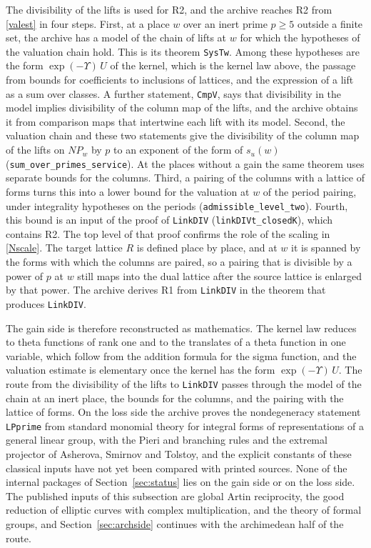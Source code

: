\documentclass[11pt,letterpaper]{article}
\numberwithin{equation}{section}
\begin{document}
The divisibility of the lifts is used for R2, and the archive reaches R2 from \eqref{valest} in four steps. First, at a place $w$ over an inert prime $p\ge5$ outside a finite set, the archive has a model of the chain of lifts at $w$ for which the hypotheses of the valuation chain hold. This is its theorem \texttt{SysTw}. Among these hypotheses are the form $\exp(-\Upsilon)\,U$ of the kernel, which is the kernel law above, the passage from bounds for coefficients to inclusions of lattices, and the expression of a lift as a sum over classes. A further statement, \texttt{CmpV}, says that divisibility in the model implies divisibility of the column map of the lifts, and the archive obtains it from comparison maps that intertwine each lift with its model. Second, the valuation chain and these two statements give the divisibility of the column map of the lifts on $N\!P_w$ by $p$ to an exponent of the form of $s_u(w)$ (\texttt{sum\_over\_primes\_service}). At the places without a gain the same theorem uses separate bounds for the columns. Third, a pairing of the columns with a lattice of forms turns this into a lower bound for the valuation at $w$ of the period pairing, under integrality hypotheses on the periods (\texttt{admissible\_level\_two}). Fourth, this bound is an input of the proof of \texttt{LinkDIV} (\texttt{linkDIVt\_closedK}), which contains R2. The top level of that proof confirms the role of the scaling in \eqref{Nscale}. The target lattice $R$ is defined place by place, and at $w$ it is spanned by the forms with which the columns are paired, so a pairing that is divisible by a power of $p$ at $w$ still maps into the dual lattice after the source lattice is enlarged by that power. The archive derives R1 from \texttt{LinkDIV} in the theorem that produces \texttt{LinkDIV}.

The gain side is therefore reconstructed as mathematics. The kernel law reduces to theta functions of rank one and to the translates of a theta function in one variable, which follow from the addition formula for the sigma function, and the valuation estimate is elementary once the kernel has the form $\exp(-\Upsilon)\,U$. The route from the divisibility of the lifts to \texttt{LinkDIV} passes through the model of the chain at an inert place, the bounds for the columns, and the pairing with the lattice of forms. On the loss side the archive proves the nondegeneracy statement \texttt{LPprime} from standard monomial theory for integral forms of representations of a general linear group, with the Pieri and branching rules and the extremal projector of Asherova, Smirnov and Tolstoy, and the explicit constants of these classical inputs have not yet been compared with printed sources. None of the internal packages of Section~\ref{sec:status} lies on the gain side or on the loss side. The published inputs of this subsection are global Artin reciprocity, the good reduction of elliptic curves with complex multiplication, and the theory of formal groups, and Section~\ref{sec:archside} continues with the archimedean half of the route.
\end{document}
